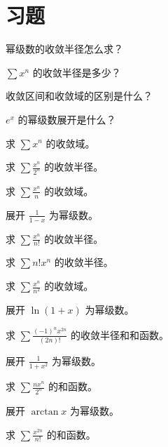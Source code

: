 \section{习题}
\begin{exercise}[0] 幂级数的收敛半径怎么求？\end{exercise}
\begin{exercise}[0] \(\sum x^n\) 的收敛半径是多少？\end{exercise}
\begin{exercise}[0] 收敛区间和收敛域的区别是什么？\end{exercise}
\begin{exercise}[0] \(e^x\) 的幂级数展开是什么？\end{exercise}
\begin{exercise}[1] 求 \(\sum x^n\) 的收敛域。\end{exercise}
\begin{exercise}[1] 求 \(\sum \frac{x^n}{2^n}\) 的收敛半径。\end{exercise}
\begin{exercise}[1] 求 \(\sum \frac{x^n}{n}\) 的收敛域。\end{exercise}
\begin{exercise}[1] 展开 \(\frac1{1-x}\) 为幂级数。\end{exercise}
\begin{exercise}[2] 求 \(\sum \frac{x^n}{n!}\) 的收敛半径。\end{exercise}
\begin{exercise}[2] 求 \(\sum n! x^n\) 的收敛半径。\end{exercise}
\begin{exercise}[2] 求 \(\sum \frac{x^n}{n^2}\) 的收敛域。\end{exercise}
\begin{exercise}[2] 展开 \(\ln(1+x)\) 为幂级数。\end{exercise}
\begin{exercise}[3] 求 \(\sum \frac{(-1)^n x^{2n}}{(2n)!}\) 的收敛半径和和函数。\end{exercise}
\begin{exercise}[3] 展开 \(\frac1{1+x^2}\) 为幂级数。\end{exercise}
\begin{exercise}[3] 求 \(\sum \frac{n x^n}{2^n}\) 的和函数。\end{exercise}
\begin{exercise}[3] 展开 \(\arctan x\) 为幂级数。\end{exercise}
\begin{exercise}[3] 求 \(\sum \frac{x^{2n}}{n!}\) 的和函数。\end{exercise}
